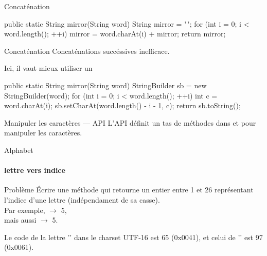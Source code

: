 \begin{hideedit}
\begin{frame}[fragile]{Concaténation}
  \pause
  \begin{java}
public static String mirror(String word) {
    String mirror = "";
    for (int i = 0; i < word.length(); ++i) {
        mirror = word.charAt(i) + mirror;
    }
    return mirror;
}
  \end{java}
\end{frame}

\begin{frame}[fragile]{Concaténation}
  Concaténations succéssives inefficace.

  \pause
  Ici, il vaut mieux utiliser un 
  \begin{java}
public static String mirror(String word) {
    StringBuilder sb = new StringBuilder(word);
    for (int i = 0; i < word.length(); ++i) {
        int c = word.charAt(i);
        sb.setCharAt(word.length() - i - 1, c);
    }
    return sb.toString();
}
  \end{java}
\end{frame}

\begin{frame}{Manipuler les caractères --- API}
  L'API définit un tas de méthodes dans  et  pour
  manipuler les caractères.
  \begin{description}
    \item {}
    \item {}
    \item {}
    \item {}
    \item {}
    \item {}
  \end{description}
\end{frame}

\begin{frame}[fragile]{Alphabet}
  \framesubtitle{lettre vers indice}
  \begin{block}{Problème}
    Écrire une méthode  qui retourne un entier entre 1 et 26
    représentant l'indice d'une lettre (indépendament de sa casse).\\
    Par exemple,  \(\rightarrow\) 5,\\
    mais aussi  \(\rightarrow\) 5.
  \end{block}

  \pause Le code de la lettre '' dans le charset UTF-16 est 65 (0x0041),
  et celui de '' est 97 (0x0061).


\end{frame}
\end{hideedit}
